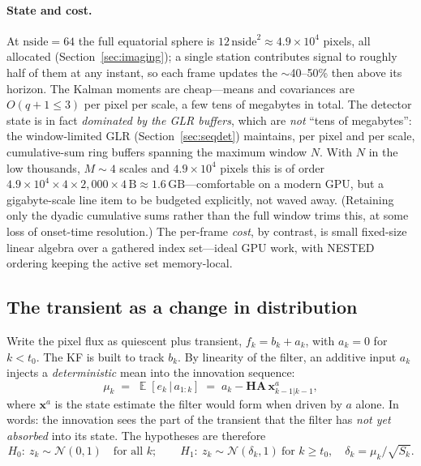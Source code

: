 \documentclass[11pt]{article}
\DeclareMathOperator{\E}{\mathbb{E}}
\newcommand{\Norm}{\mathcal{N}}
\newcommand{\given}{\,|\,}
\begin{document}
\paragraph{State and cost.} At $\mathrm{nside}=64$ the full equatorial sphere is
$12\,\mathrm{nside}^2\approx4.9\times10^4$ pixels, all allocated (Section~\ref{sec:imaging}); a
single station contributes signal to roughly half of them at any instant, so each frame updates the
$\sim$40--50\% then above its horizon. The Kalman moments are cheap---means and covariances are
$O(q{+}1\le3)$ per pixel per scale, a few tens of megabytes in total. The detector state is in fact
\emph{dominated by the GLR buffers}, which are \emph{not} ``tens of megabytes'': the window-limited
GLR (Section~\ref{sec:seqdet}) maintains, per pixel and per scale, cumulative-sum ring buffers
spanning the maximum window $N$. With $N$ in the low thousands, $M\sim4$ scales and
$4.9\times10^4$ pixels this is of order
$4.9\!\times\!10^4\times4\times2{,}000\times4\,\mathrm{B}\approx1.6\,\mathrm{GB}$---comfortable on a
modern GPU, but a gigabyte-scale line item to be budgeted explicitly, not waved away. (Retaining
only the dyadic cumulative sums rather than the full window trims this, at some loss of onset-time
resolution.) The per-frame \emph{cost}, by contrast, is small fixed-size linear algebra over a
gathered index set---ideal GPU work, with NESTED ordering keeping the active set memory-local.

\subsection{The transient as a change in distribution}
\label{sec:change}

Write the pixel flux as quiescent plus transient, $f_k=b_k+a_k$, with $a_k=0$ for
$k<t_0$. The KF is built to track $b_k$. By linearity of the filter, an additive input
$a_k$ injects a \emph{deterministic} mean into the innovation sequence:
\begin{equation}
  \mu_k \;=\; \E[e_k\given a_{1:k}] \;=\; a_k - \bm{H}\bm{A}\,\bm{x}^{a}_{k-1|k-1},
  \label{eq:mu}
\end{equation}
where $\bm{x}^{a}$ is the state estimate the filter would form when driven by $a$
alone. In words: the innovation sees the part of the transient that the filter has
\emph{not yet absorbed} into its state. The hypotheses are therefore
\begin{equation}
  H_0:\ z_k\sim\Norm(0,1)\quad\text{for all }k;
  \qquad
  H_1:\ z_k\sim\Norm(\delta_k,1)\ \text{for }k\ge t_0,\quad \delta_k=\mu_k/\sqrt{S_k}.
\end{equation}
\end{document}
